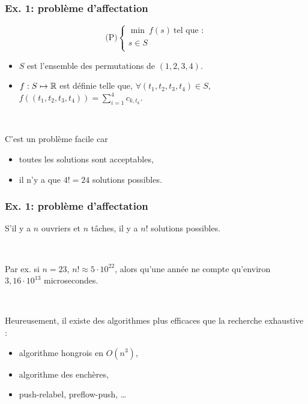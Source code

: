 \documentclass{beamer}
\newcommand{\R}{{\ensuremath\mathbb{R}}}
\begin{document}
\begin{frame}
  \frametitle{Ex. 1: problème d'affectation}

  \[
  \text{(P)} \left\{
  \begin{array}{c}
    \min \ f(s) \ \text{tel que :} \\
    s \in S \\
  \end{array}
  \right.
  \]

  \begin{itemize}
  \item $S$ est l'ensemble des permutations de $(1,2,3,4)$. 
  \item $f : S \mapsto \R$ est définie telle que, $\forall (t_1,t_2,t_3,t_4) \in S$, \\
    $f( (t_1,t_2,t_3,t_4) ) = \sum_{i=1}^4 c_{k,t_k}$. 
  \end{itemize}

  ~
  
  C'est un problème facile car
  \begin{itemize}
  \item toutes les solutions sont acceptables,
  \item il n'y a que $4! = 24$ solutions possibles. 
  \end{itemize}

\end{frame}

\begin{frame}
  \frametitle{Ex. 1: problème d'affectation}

  S'il y a $n$ ouvriers et $n$ tâches,
  il y a $n!$ solutions possibles. 

  ~
  
  Par ex. si $n = 23$, $n! \approx 5 \cdot 10^{22}$, alors qu'une
  année ne compte qu'environ $3,16 \cdot 10^{13}$ microsecondes.

  ~
  
  Heureusement, il existe des algorithmes plus efficaces
  que la recherche exhaustive :
  \begin{itemize}
  \item algorithme hongrois en $O(n^3)$,
  \item algorithme des enchères,
  \item push-relabel, preflow-push, \dots
  \end{itemize}
  
\end{frame}
\end{document}
